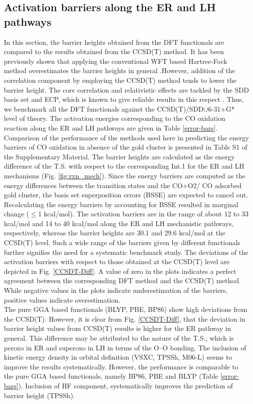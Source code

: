 \subsection{Activation barriers along the ER and LH pathways}
In this section, the barrier heights obtained from the DFT functionals are compared to the results obtained from the CCSD(T) method. It has been previously shown that applying the conventional WFT based Hartree-Fock method overestimates the barrier heights in general \cite{zhao2004jpca}.However, addition of the correlation component by employing the CCSD(T) method tends to lower the barrier height. The core correlation and relativistic effects are tackled by the SDD basis set and ECP, which is known to give reliable results in this respect \cite{Assado2009}. Thus, we benchmark all the DFT functionals against the CCSD(T)/SDD$\cup$6-31+G* level of theory. The activation energies corresponding to the CO oxidation reaction along the ER and LH pathways are given in Table \ref{error-bars}. Comparison of the performance of the methods used here in predicting the energy barriers of CO oxidation in absence of the gold cluster is presented in Table S1 of the Supplementary Material. The barrier heights are calculated as the energy difference of the T.S. with respect to the corresponding Int.1 for the ER and LH mechanisms (Fig. \ref{fig:rxn_mech}). Since the energy barriers are computed as the energy differences between the transition states and the CO+O2/ CO adsorbed gold cluster, the basis set superposition errors (BSSE) are expected to cancel out. Recalculating the energy barriers by accounting for BSSE resulted in marginal change ($\leq$1 kcal/mol). The activation barriers are in the range of about 12 to 33 kcal/mol and 14 to 40 kcal/mol along the ER and LH mechanistic pathways, respectively, whereas the barrier heights are 30.1 and 29.6 kcal/mol at the CCSD(T) level. Such a wide range of the barriers given by different functionals further signifies the need for a systematic benchmark study. The deviations of the activation barriers with respect to those obtained at the CCSD(T) level are depicted in Fig. \ref{CCSDT-Diff}. A value of zero in the plots indicates a perfect agreement between the corresponding DFT method and the CCSD(T) method. While negative values in the plots indicate underestimation of the barriers, positive values indicate overestimation. \\
The pure GGA based functionals (BLYP, PBE, BP86) show high deviations from the CCSD(T). However, it is clear from Fig. \ref{CCSDT-Diff}, that the deviation in barrier height values from CCSD(T) results is higher for the ER pathway in general. This difference may be attributed to the nature of the T.S., which is peroxo in ER and superoxo in LH in terms of the O--O bonding. The inclusion of kinetic energy density in orbital definition (VSXC, TPSSh, M06-L) seems to improve the results systematically. However, the performance is comparable to the pure GGA based functionals, namely BP86, PBE and BLYP (Table \ref{error-bars}). Inclusion of HF component, systematically improves the prediction of barrier height (TPSSh). \\
